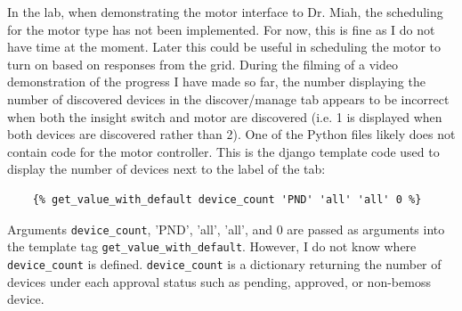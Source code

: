 \documentclass[fontsize=11pt, %
                             paper=letter, %
                             twoside, %
                             captions=tableheading,
                             index=totoc,
                             hyperref]{labbook}
\begin{document}
\begin{addmargin}[0cm]{0cm}


In the lab, when demonstrating the motor interface to Dr. Miah, the scheduling for the motor type has not been implemented. For now, this is fine as I do not have time at the moment. Later this could be useful in scheduling the motor to turn on based on responses from the grid. During the filming of a video demonstration of the progress I have made so far, the number displaying the number of discovered devices in the discover/manage tab appears to be incorrect when both the insight switch and motor are discovered (i.e. 1 is displayed when both devices are discovered rather than 2). One of the Python files likely does not contain code for the motor controller. This is the django template code used to display the number of devices next to the label of the tab:
\begin{verbatim}
	{% get_value_with_default device_count 'PND' 'all' 'all' 0 %}
\end{verbatim} 
Arguments \texttt{device\_count}, 'PND', 'all', 'all', and 0 are passed as arguments into the template tag \texttt{get\_value\_with\_default}. However, I do not know where \texttt{device\_count} is defined. \texttt{device\_count} is a dictionary returning the number of devices under each approval status such as pending, approved, or non-bemoss device.


\end{addmargin}
\end{document}
